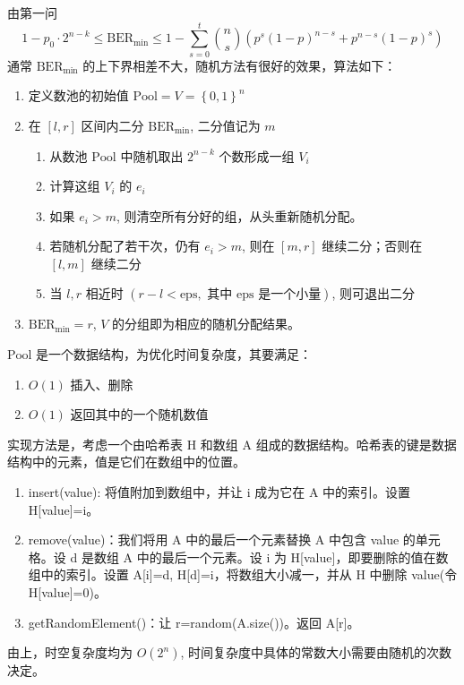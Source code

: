 由第一问
\[1-p_0\cdot 2^{n-k}\le\mathrm{BER}_\mathrm{min}\le 1-\sum_{s=0}^t\binom{n}{s}\left(p^s\left(1-p\right)^{n-s}+p^{n-s}\left(1-p\right)^s\right)\]
通常 \(\mathrm{BER}_\mathrm{min}\) 的上下界相差不大，随机方法有很好的效果，算法如下：
\begin{enumerate}
  \item 定义数池的初始值 \(\mathrm{Pool}=V=\left\{0,1\right\}^n\)
  \item 在 \(\left[l,r\right]\) 区间内二分 \(\mathrm{BER}_\mathrm{min}\), 二分值记为 \(m\)
  \begin{enumerate}
    \item 从数池 \(\mathrm{Pool}\) 中随机取出 \(2^{n-k}\) 个数形成一组 \(V_i\)
    \item 计算这组 \(V_i\) 的 \(e_i\)
    \item 如果 \(e_i>m\), 则清空所有分好的组，从头重新随机分配。
    \item 若随机分配了若干次，仍有 \(e_i>m\), 则在 \(\left[m,r\right]\) 继续二分；否则在 \(\left[l,m\right]\) 继续二分
    \item 当 \(l,r\) 相近时 \(\left(r-l<\mathrm{eps},\text{ 其中 }\mathrm{eps}\text{ 是一个小量}\right)\), 则可退出二分
  \end{enumerate}
  \item \(\mathrm{BER}_\mathrm{min}=r\), \(V\) 的分组即为相应的随机分配结果。
\end{enumerate}

\(\mathrm{Pool}\) 是一个数据结构，为优化时间复杂度，其要满足：
\begin{enumerate}
  \item \(O\left(1\right)\) 插入、删除
  \item \(O\left(1\right)\) 返回其中的一个随机数值
\end{enumerate}

实现方法是\cite{main}，考虑一个由哈希表 H 和数组 A 组成的数据结构。哈希表的键是数据结构中的元素，值是它们在数组中的位置。
\begin{enumerate}
  \item insert(value): 将值附加到数组中，并让 i 成为它在 A 中的索引。设置 H[value]=i。
  \item remove(value)：我们将用 A 中的最后一个元素替换 A 中包含 value 的单元格。设 d 是数组 A 中的最后一个元素。设 i 为 H[value]，即要删除的值在数组中的索引。设置 A[i]=d, H[d]=i，将数组大小减一，并从 H 中删除 value(令 H[value]=0)。
  \item getRandomElement()：让 r=random(A.size())。返回 A[r]。
\end{enumerate}

由上，时空复杂度均为 \(O\left(2^n\right)\), 时间复杂度中具体的常数大小需要由随机的次数决定。